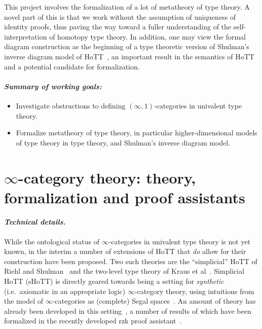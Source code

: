 \documentclass[a4paper]{article}
\begin{document}
This project involves the formalization of a lot of metatheory of type theory.
A novel part of this is that we work without the assumption of uniqueness of identity proofs, thus paving the way toward a fuller understanding of the self-interpretation of homotopy type theory.
In addition, one may view the formal diagram construction as the beginning of a type theoretic version of Shulman's inverse diagram model of HoTT~\cite{shulman:15:univalence}, an important result in the semantics of HoTT and a potential candidate for formalization.

\paragraph{\normalfont\textit{Summary of working goals:}}
\begin{itemize}
    \item Investigate obstructions to defining $(\infty, 1)$-categories in univalent type theory.
    \item Formalize metatheory of type theory, in particular higher-dimensional models of type theory in type theory, and Shulman's inverse diagram model.
\end{itemize}


\section*{$\infty$-category theory: theory, formalization and proof assistants}

\paragraph{\normalfont\textit{Technical details.}} While the ontological status of $\infty$-categories in univalent type theory is not yet known, in the interim a number of extensions of HoTT that \emph{do} allow for their construction have been proposed.
Two such theories are the ``simplicial'' HoTT of Riehl and Shulman~\cite{riehl-shulman:23:shott} and the two-level type theory of Kraus et al~\cite{acks:23:2ltt}.
Simplicial HoTT (sHoTT) is directly geared towards being a setting for \emph{synthetic} (i.e.\ axiomatic in an appropriate logic) $\infty$-category theory, using intuitions from the model of $\infty$-categories as (complete) Segal spaces~\cite{rezk:01:model}.
An amount of theory has already been developed in this setting~\cite{martinez:22:limits,buchholtz-weinberger:23:synthetic-fibered-cat-theory,krw:23:infty-yoneda}, a number of results of which have been formalized in the recently developed rzk proof assistant~\cite{kudasov:23:rzk}.
\end{document}
